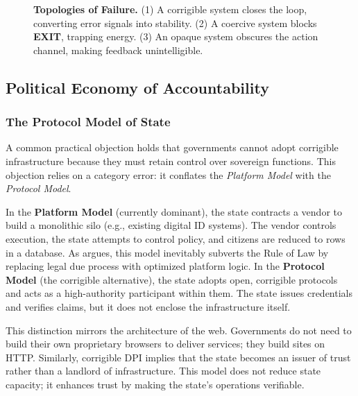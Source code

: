 \begin{figure}[htbp]
\caption{\textbf{Topologies of Failure.}
(1) A corrigible system closes the loop, converting error signals into stability.
(2) A coercive system blocks \textbf{EXIT}, trapping energy.
(3) An opaque system obscures the action channel, making feedback unintelligible.}
\label{fig:failure_modes}
\end{figure}

\subsection{Political Economy of Accountability}
\label{subsec:political-economy}

\subsubsection{The Protocol Model of State}

A common practical objection holds that governments cannot adopt corrigible infrastructure because they must retain control over sovereign functions. This objection relies on a category error: it conflates the \textit{Platform Model} with the \textit{Protocol Model}.

In the \textbf{Platform Model} (currently dominant), the state contracts a vendor to build a monolithic silo (e.g., existing digital ID systems). The vendor controls execution, the state attempts to control policy, and citizens are reduced to rows in a database. As \citet{cohen2019} argues, this model inevitably subverts the Rule of Law by replacing legal due process with optimized platform logic. In the \textbf{Protocol Model} (the corrigible alternative), the state adopts open, corrigible protocols and acts as a high-authority participant within them. The state issues credentials and verifies claims, but it does not enclose the infrastructure itself.

This distinction mirrors the architecture of the web. Governments do not need to build their own proprietary browsers to deliver services; they build sites on HTTP. Similarly, corrigible DPI implies that the state becomes an issuer of trust rather than a landlord of infrastructure. This model does not reduce state capacity; it enhances trust by making the state's operations verifiable.

